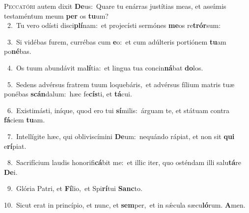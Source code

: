 \lettrine{\initial\textcolor{\initialcolor}{P}}{eccatóri} autem dixit \textbf{De}\-us:~\star Quare tu enárras justítias meas, et assúmis testaméntum meum \textbf{per} os \textbf{tu}\-um?\\
{\numbfont\textcolor{\numbcolor}{~2.}}~Tu vero odísti disci\-\textbf{plí}\-nam:~\star et projecísti sermónes \textbf{me}\-os re\-\textbf{trór}\-sum:\par
{\numbfont\textcolor{\numbcolor}{~3.}}~Si vidébas furem, currébas cum \textbf{e}\-o:~\star et cum adúlteris portiónem \textbf{tu}\-am po\-\textbf{né}\-bas.\par
{\numbfont\textcolor{\numbcolor}{~4.}}~Os tuum abundávit ma\-\textbf{lí}\-tia:~\star et lingua tua concin\-\textbf{ná}\-bat \textbf{do}\-los.\par
{\numbfont\textcolor{\numbcolor}{~5.}}~Sedens advérsus fratrem tuum loquebáris,~\dagger et advérsus fílium matris tuæ ponébas \textbf{scán}\-dalum:~\star hæc fe\-\textbf{cís}\-ti, et \textbf{tá}\-cui.\par
{\numbfont\textcolor{\numbcolor}{~6.}}~Existimásti, iníque, quod ero tui \textbf{sí}\-milis:~\star árguam te, et státuam contra \textbf{fá}\-ciem \textbf{tu}\-am.\par
{\numbfont\textcolor{\numbcolor}{~7.}}~Intellígite hæc, qui obliviscímini \textbf{De}\-um:~\star nequándo rápiat, et non sit \textbf{qui} e\-\textbf{rí}\-piat.\par
{\numbfont\textcolor{\numbcolor}{~8.}}~Sacrifícium laudis honorifi\-\textbf{cá}\-bit me:~\star et illic iter, quo osténdam illi salu\-\textbf{tá}\-re \textbf{De}\-i.\par
{\numbfont\textcolor{\numbcolor}{~9.}}~Glória Patri, et \textbf{Fí}\-lio,~\star et Spi\-\textbf{rí}\-tui \textbf{Sanc}\-to.\par
{\numbfont\textcolor{\numbcolor}{10.}}~Sicut erat in princípio, et nunc, et \textbf{sem}\-per,~\star et in sǽcula sæcu\-\textbf{ló}\-rum. \textbf{A}\-men.\par
